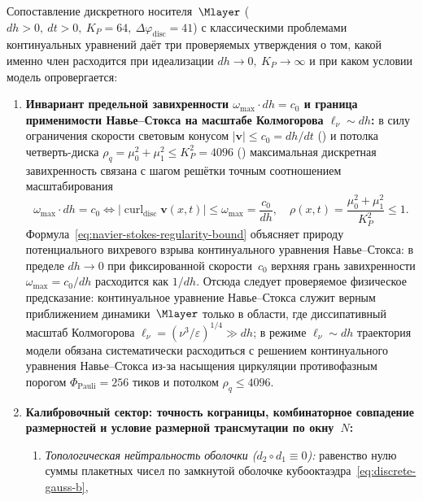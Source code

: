 \begin{proposition}
\label{prop:continuum-open-problems-as-artifacts}
Сопоставление дискретного носителя~$\Mlayer$ ($dh>0,\ dt>0,\ K_P=64,\ \Delta\varphi_{\mathrm{disc}}=41$) с классическими проблемами континуальных уравнений
даёт три проверяемых утверждения о том, какой именно член расходится при идеализации $dh\to 0,\ K_P\to\infty$ и при каком условии модель опровергается:
\begin{enumerate}[label=(\roman*)]
\item \textbf{Инвариант предельной завихренности $\omega_{\max}\cdot dh = c_0$ и граница применимости Навье--Стокса на масштабе Колмогорова $\ell_\nu \sim dh$:}
  в силу ограничения скорости световым конусом $|\mathbf{v}|\le c_0 = dh/dt$ () и потолка четверть-диска $\rho_q = \mu_0^2 + \mu_1^2 \le K_P^2 = 4096$ ()
  максимальная дискретная завихренность связана с шагом решётки точным соотношением масштабирования
  \begin{equation}
  \label{eq:navier-stokes-regularity-bound}
    \omega_{\max}\cdot dh = c_0
    \iff
    \bigl|\operatorname{curl}_{\mathrm{disc}}\mathbf{v}(x,t)\bigr| \le \omega_{\max} = \frac{c_0}{dh},
    \quad
    \rho(x,t) = \frac{\mu_0^2 + \mu_1^2}{K_P^2} \le 1.
  \end{equation}
  Формула~\eqref{eq:navier-stokes-regularity-bound} объясняет природу потенциального вихревого взрыва континуального уравнения Навье--Стокса:
  в пределе $dh\to 0$ при фиксированной скорости~$c_0$ верхняя грань завихренности $\omega_{\max} = c_0/dh$ расходится как $1/dh$.
  Отсюда следует проверяемое физическое предсказание: континуальное уравнение Навье--Стокса служит верным приближением динамики~$\Mlayer$
  только в области, где диссипативный масштаб Колмогорова $\ell_\nu = (\nu^3/\varepsilon)^{1/4} \gg dh$;
  в режиме $\ell_\nu \sim dh$ траектория модели обязана систематически расходиться с решением континуального уравнения Навье--Стокса
  из-за насыщения циркуляции противофазным порогом $\Phi_{\mathrm{Pauli}}=256$ тиков и потолком $\rho_q\le 4096$.
\item \textbf{Калибровочный сектор: точность кограницы, комбинаторное совпадение размерностей и условие размерной трансмутации по окну~$N$:}
  \begin{enumerate}[label=(\alph*)]
  \item \emph{Топологическая нейтральность оболочки ($d_2\circ d_1 \equiv 0$):}
    равенство нулю суммы плакетных чисел по замкнутой оболочке кубооктаэдра~\eqref{eq:discrete-gauss-b},

\end{enumerate}
\end{enumerate}
\end{proposition}
